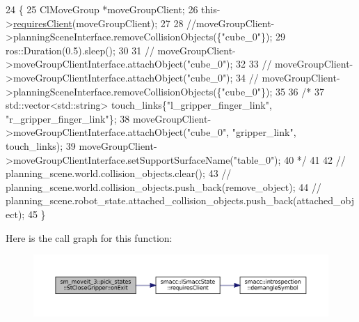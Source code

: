 \begin{DoxyCode}
24    \{
25       ClMoveGroup *moveGroupClient;
26       this->\hyperlink{classsmacc_1_1ISmaccState_a7f95c9f0a6ea2d6f18d1aec0519de4ac}{requiresClient}(moveGroupClient);
27 
28       \textcolor{comment}{//moveGroupClient->planningSceneInterface.removeCollisionObjects(\{"cube\_0"\});}
29       ros::Duration(0.5).sleep();
30 
31       \textcolor{comment}{// moveGroupClient->moveGroupClientInterface.attachObject("cube\_0");}
32 
33       \textcolor{comment}{// moveGroupClient->moveGroupClientInterface.attachObject("cube\_0");}
34       \textcolor{comment}{// moveGroupClient->planningSceneInterface.removeCollisionObjects(\{"cube\_0"\});}
35 
36       \textcolor{comment}{/*}
37 \textcolor{comment}{         std::vector<std::string> touch\_links\{"l\_gripper\_finger\_link", "r\_gripper\_finger\_link"\};}
38 \textcolor{comment}{         moveGroupClient->moveGroupClientInterface.attachObject("cube\_0", "gripper\_link", touch\_links);}
39 \textcolor{comment}{         moveGroupClient->moveGroupClientInterface.setSupportSurfaceName("table\_0");}
40 \textcolor{comment}{         */}
41 
42       \textcolor{comment}{// planning\_scene.world.collision\_objects.clear();}
43       \textcolor{comment}{// planning\_scene.world.collision\_objects.push\_back(remove\_object);}
44       \textcolor{comment}{// planning\_scene.robot\_state.attached\_collision\_objects.push\_back(attached\_object);}
45    \}
\end{DoxyCode}
Here is the call graph for this function\+:
\nopagebreak
\begin{figure}[H]
\begin{center}
\leavevmode
\includegraphics[width=350pt]{structsm__moveit__3_1_1pick__states_1_1StCloseGripper_ace46820d7eac4f25e32f189539e41a04_cgraph}
\end{center}
\end{figure}
\mbox{\label{structsm__moveit__3_1_1pick__states_1_1StCloseGripper_a07b6a9681410c8d1f91293309db62b4b}} 
